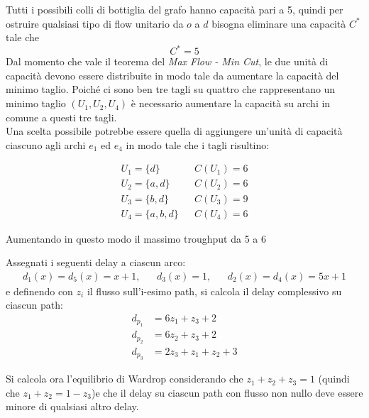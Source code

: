 \documentclass[11pt,largemargins]{homework}
\begin{document}
  \begin{alphaparts}
    \questionpart
    Tutti i possibili colli di bottiglia del grafo hanno capacità pari a 5, quindi per ostruire qualsiasi tipo di flow unitario da \(o\) a \(d\) bisogna eliminare una capacità \(C^*\) tale che
    \begin{equation*}
      C^*=5
    \end{equation*}
    \questionpart
    Dal momento che vale il teorema del \textit{Max Flow - Min Cut}, le due unità di capacità devono essere distribuite in modo tale da aumentare la capacità del minimo taglio. Poiché ci sono ben tre tagli su quattro che rappresentano un minimo taglio \((U_1, U_2, U_4)\) è necessario aumentare la capacità su archi in comune a questi tre tagli.\\
    Una scelta possibile potrebbe essere quella di aggiungere un'unità di capacità ciascuno agli archi \(e_1\) ed \(e_4\) in modo tale che i tagli risultino:
    
  \begin{align*}
    U_1 = \{d\}\  && C(U_1)=6 \\
    U_2 = \{a, d\} && C(U_2)=6 \\
    U_3 = \{b,d\} && C(U_3)=9 \\
    U_4 = \{a,b,d\} && C(U_4)=6
  \end{align*}

  Aumentando in questo modo il massimo troughput da 5 a 6

  \questionpart
  Assegnati i seguenti delay a ciascun arco:
  \begin{align*}
    d_1(x)=d_5(x)=x+1, && d_3(x)=1, && d_2(x)=d_4(x)=5x+1
  \end{align*}
  e definendo con \(z_i\) il flusso sull'i-esimo path, si calcola il delay complessivo su ciascun path:
  \begin{align*}
    d_{p_1}&=6z_1+z_3+2 \\
    d_{p_2}&=6z_2+z_3+2 \\
    d_{p_3}&=2z_3+z_1+z_2+3
  \end{align*}

  Si calcola ora l'equilibrio di Wardrop considerando che \(z_1+z_2+z_3=1\) (quindi che \(z_1+z_2=1-z_3\))e che il delay su ciascun path con flusso non nullo deve essere minore di qualsiasi altro delay.


\end{alphaparts}
\end{document}

